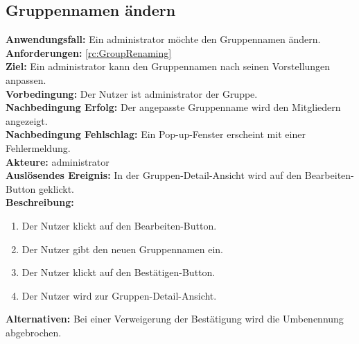 \documentclass[parskip=full]{scrartcl}
\begin{document}
\subsection{Gruppennamen ändern}
\textbf{Anwendungsfall:} Ein \Gls{administrator} möchte den Gruppennamen ändern.\\
\textbf{Anforderungen:} \ref{rc:GroupRenaming}\\
\textbf{Ziel:} Ein \Gls{administrator} kann den Gruppennamen nach seinen Vorstellungen anpassen.\\
\textbf{Vorbedingung:} Der Nutzer ist \Gls{administrator} der Gruppe.\\
\textbf{Nachbedingung Erfolg:} Der angepasste Gruppenname wird den Mitgliedern angezeigt.\\
\textbf{Nachbedingung Fehlschlag:} Ein Pop-up-Fenster erscheint mit einer Fehlermeldung.\\
\textbf{Akteure:} \Gls{administrator}\\
\textbf{Auslösendes Ereignis:} In der Gruppen-Detail-Ansicht wird auf den Bearbeiten-Button geklickt.\\
\textbf{Beschreibung:}
\begin{enumerate}
    \item Der Nutzer klickt auf den Bearbeiten-Button.
    \item Der Nutzer gibt den neuen Gruppennamen ein.
    \item Der Nutzer klickt auf den Bestätigen-Button.
    \item Der Nutzer wird zur Gruppen-Detail-Ansicht.
\end{enumerate}
\textbf{Alternativen:} Bei einer Verweigerung der Bestätigung wird die Umbenennung abgebrochen.
\newpage
\end{document}
